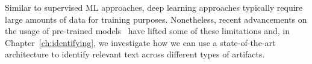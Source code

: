 Similar to supervised \acs{ML} approaches, deep learning approaches 
typically require large amounts of data for training purposes.
Nonetheless, recent advancements on the usage of
pre-trained models~\cite{erhan2010pre-train} 
have lifted some of these limitations and,
in Chapter~\ref{ch:identifying},
we investigate how we can use a state-of-the-art architecture 
to identify relevant text across different types of artifacts.



























